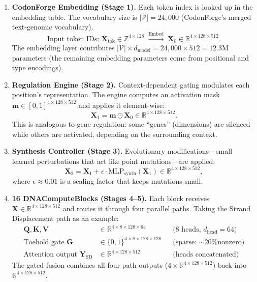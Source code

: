 \begin{enumerate}[leftmargin=1.8em]
  \item \textbf{CodonForge Embedding (Stage 1).} Each token index is looked up in the embedding table. The vocabulary size is $|\mathcal{V}| = 24{,}000$ (CodonForge's merged text-genomic vocabulary).
  \begin{equation*}
    \text{Input token IDs: } \mathbf{X}_{\mathrm{tok}} \in \mathbb{Z}^{4 \times 128} \;\xrightarrow{\text{Embed}}\; \mathbf{X}_0 \in \mathbb{R}^{4 \times 128 \times 512}.
  \end{equation*}
  The embedding layer contributes $|\mathcal{V}| \times d_{\text{model}} = 24{,}000 \times 512 = 12.3\text{M}$ parameters (the remaining embedding parameters come from positional and type encodings).

  \item \textbf{Regulation Engine (Stage 2).} Context-dependent gating modulates each position's representation. The engine computes an activation mask $\mathbf{m} \in [0,1]^{4 \times 128 \times 512}$ and applies it element-wise:
  \begin{equation*}
    \mathbf{X}_1 = \mathbf{m} \odot \mathbf{X}_0 \in \mathbb{R}^{4 \times 128 \times 512}.
  \end{equation*}
  This is analogous to gene regulation: some ``genes'' (dimensions) are silenced while others are activated, depending on the surrounding context.

  \item \textbf{Synthesis Controller (Stage 3).} Evolutionary modifications---small learned perturbations that act like point mutations---are applied:
  \begin{equation*}
    \mathbf{X}_2 = \mathbf{X}_1 + \epsilon \cdot \mathrm{MLP}_{\mathrm{synth}}(\mathbf{X}_1) \in \mathbb{R}^{4 \times 128 \times 512},
  \end{equation*}
  where $\epsilon \approx 0.01$ is a scaling factor that keeps mutations small.

  \item \textbf{16 DNAComputeBlocks (Stages 4--5).} Each block receives $\mathbf{X} \in \mathbb{R}^{4 \times 128 \times 512}$ and routes it through four parallel paths. Taking the Strand Displacement path as an example:
  \begin{align*}
    \mathbf{Q}, \mathbf{K}, \mathbf{V} &\in \mathbb{R}^{4 \times 8 \times 128 \times 64} & & \text{(8 heads, $d_{\mathrm{head}} = 64$)} \\
    \text{Toehold gate } \mathbf{G} &\in \{0,1\}^{4 \times 8 \times 128 \times 128} & & \text{(sparse: $\sim$20\% nonzero)} \\
    \text{Attention output } \mathbf{Y}_{\mathrm{SD}} &\in \mathbb{R}^{4 \times 128 \times 512} & & \text{(heads concatenated)}
  \end{align*}
  The gated fusion combines all four path outputs ($4 \times \mathbb{R}^{4 \times 128 \times 512}$) back into $\mathbb{R}^{4 \times 128 \times 512}$.


\end{enumerate}
